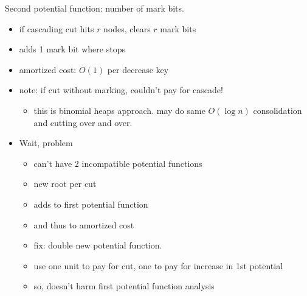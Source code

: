 \documentclass{article}
\begin{document}
Second potential function: number of mark bits.
\begin{itemize}
\item if cascading cut hits $r$ nodes, clears $r$ mark bits
\item adds 1 mark bit where stops
\item amortized cost: $O(1)$ per decrease key
\item note: if cut without marking, couldn't pay for cascade!
\begin{itemize}
\item this is binomial heaps approach.  may do same $O(\log n)$
  consolidation and cutting over and over.
\end{itemize}
\item Wait, problem
  \begin{itemize}
    \item can't have 2 incompatible potential functions
\item new root per cut 
\item adds to first potential function
\item and thus to amortized cost
\item fix: double new potential function.
\item use one unit to pay for cut, one to pay for increase in 1st potential
\item so, doesn't harm first potential function analysis
\end{itemize}
\end{itemize}
\end{document}
